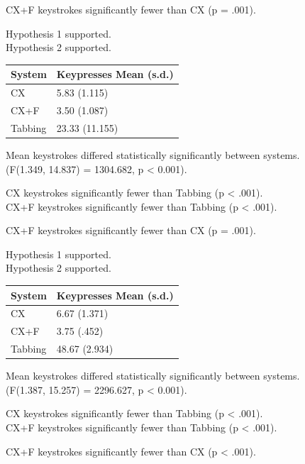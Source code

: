 \documentclass[a4paper, 12pt]{report}
\begin{document}
CX+F keystrokes significantly fewer than CX (p = .001).

Hypothesis 1 supported.\\
Hypothesis 2 supported.

\begin{tabular}{l l}
\hline\hline %
System & Keypresses Mean (s.d.) \\ [0.5ex] %
\hline %
CX & 5.83 (1.115)\\
CX+F & 3.50 (1.087)\\
Tabbing & 23.33 (11.155)\\ [1ex] %
\hline %
\end{tabular}

Mean keystrokes differed statistically significantly between systems.\\
(F(1.349, 14.837) = 1304.682, p < 0.001).

CX keystrokes significantly fewer than Tabbing (p < .001).\\
CX+F keystrokes significantly fewer than Tabbing (p < .001).

CX+F keystrokes significantly fewer than CX (p = .001).

Hypothesis 1 supported.\\
Hypothesis 2 supported.

\begin{tabular}{l l}
\hline\hline %
System & Keypresses Mean (s.d.) \\ [0.5ex] %
\hline %
CX & 6.67 (1.371)\\
CX+F & 3.75 (.452)\\
Tabbing & 48.67 (2.934)\\ [1ex] %
\hline %
\end{tabular}

Mean keystrokes differed statistically significantly between systems.\\
(F(1.387, 15.257) = 2296.627, p < 0.001).

CX keystrokes significantly fewer than Tabbing (p < .001).\\
CX+F keystrokes significantly fewer than Tabbing (p < .001).

CX+F keystrokes significantly fewer than CX (p < .001).
\end{document}
